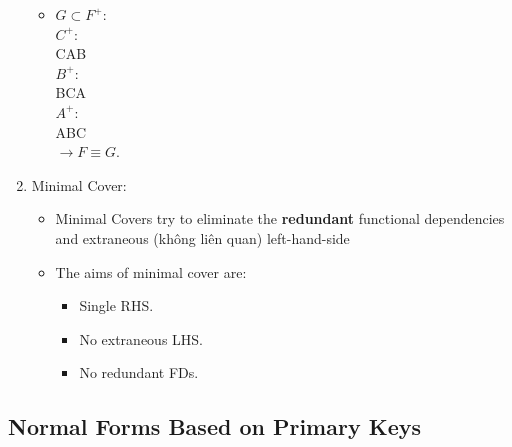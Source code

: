 \documentclass[10pt]{article}
\newcommand{\tf}{\textbf}
\newcommand{\rarrow}{\rightarrow}
\begin{document}
\begin{enumerate}
\begin{itemize}
		\item 	$G \subset F^{+}$: \\
				$C^{+}$: \\
				CAB \\
				$B^{+}$: \\
				BCA \\
				$A^{+}$: \\
				ABC \\
		$\rarrow F \equiv G$. 
		\end{itemize}

		\item Minimal Cover: \\
		
		\begin{itemize}
			\item Minimal Covers try to eliminate the \tf{redundant} functional dependencies and extraneous (không liên quan) left-hand-side
			\item The aims of minimal cover are:
			
			\begin{itemize}
				\item Single RHS.
				\item No extraneous LHS.
				\item No redundant FDs.
			\end{itemize}
		\end{itemize}
\end{enumerate}

\subsection{Normal Forms Based on Primary Keys}
\end{document}
